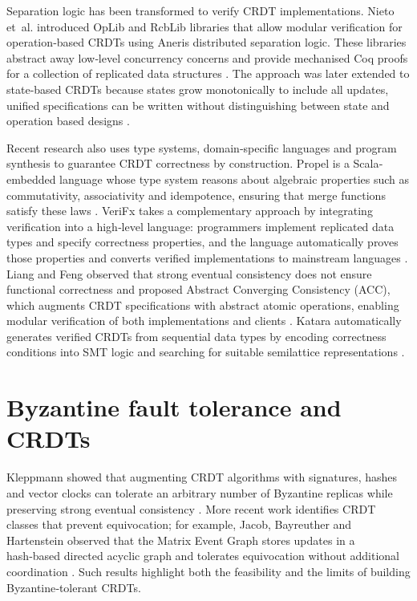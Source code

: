 Separation logic has been transformed to verify CRDT implementations. Nieto et~al. introduced OpLib and RcbLib libraries that allow modular verification for operation‐based CRDTs using Aneris distributed separation logic. These libraries abstract away low‐level concurrency concerns and provide mechanised Coq proofs for a collection of replicated data structures \cite{nieto2022modular}. The approach was later extended to state‐based CRDTs because states grow monotonically to include all updates, unified specifications can be written without distinguishing between state and operation based designs \cite{nieto2023modular}.

Recent research also uses type systems, domain‐specific languages and program synthesis to guarantee CRDT correctness by construction. Propel is a Scala‐embedded language whose type system reasons about algebraic properties such as commutativity, associativity and idempotence, ensuring that merge functions satisfy these laws \cite{zakhour2023type}. VeriFx takes a complementary approach by integrating verification into a high‐level language: programmers implement replicated data types and specify correctness properties, and the language automatically proves those properties and converts verified implementations to mainstream languages \cite{porre2024verifx}. Liang and Feng observed that strong eventual consistency does not ensure functional correctness and proposed Abstract Converging Consistency (ACC), which augments CRDT specifications with abstract atomic operations, enabling modular verification of both implementations and clients \cite{liang2021abstraction}. Katara automatically generates verified CRDTs from sequential data types by encoding correctness conditions into SMT logic and searching for suitable semilattice representations \cite{laddad2022katara}.

\section{Byzantine fault tolerance and CRDTs}

Kleppmann showed that augmenting CRDT algorithms with signatures, hashes and vector clocks can tolerate an arbitrary number of Byzantine replicas while preserving strong eventual consistency \cite{kleppmann2022making}. More recent work identifies CRDT classes that prevent equivocation; for example, Jacob, Bayreuther and Hartenstein observed that the Matrix Event Graph stores updates in a hash‑based directed acyclic graph and tolerates equivocation without additional coordination \cite{jacob2022byzantine}. Such results highlight both the feasibility and the limits of building Byzantine‑tolerant CRDTs.

